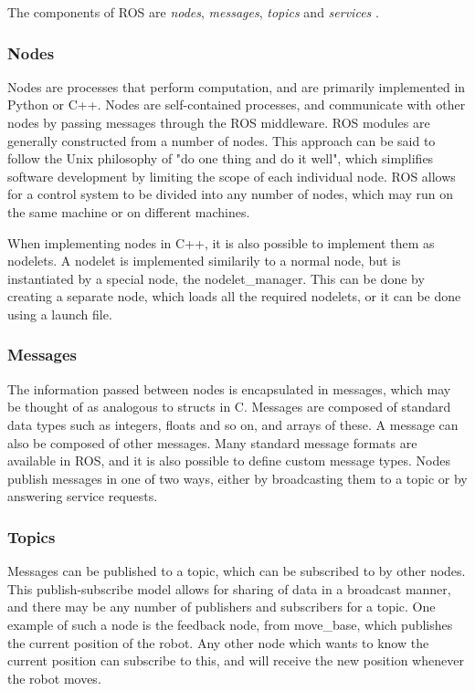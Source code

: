 \documentclass[\rootfolder/main.tex]{subfiles}
\begin{document}
The components of ROS are \emph{nodes}, \emph{messages}, \emph{topics} and \emph{services} \cite{Quigley2009}.

\subsubsection{Nodes}

Nodes are processes that perform computation, and are primarily implemented in Python or C++.
Nodes are self-contained processes, and communicate with other nodes by passing messages through the ROS middleware.
ROS modules are generally constructed from a number of nodes.
This approach can be said to follow the Unix philosophy of "do one thing and do it well", which simplifies software development by limiting the scope of each individual node.
ROS allows for a control system to be divided into any number of nodes, which may run on the same machine or on different machines.

When implementing nodes in C++, it is also possible to implement them as nodelets.
A nodelet is implemented similarily to a normal node, but is instantiated by a special node, the nodelet\_manager.
This can be done by creating a separate node, which loads all the required nodelets, or it can be done using a launch file.

\subsubsection{Messages}

The information passed between nodes is encapsulated in messages, which may be thought of as analogous to structs in C.
Messages are composed of standard data types such as integers, floats and so on, and arrays of these.
A message can also be composed of other messages.
Many standard message formats are available in ROS, and it is also possible to define custom message types.
Nodes publish messages in one of two ways, either by broadcasting them to a topic or by answering service requests.

\subsubsection{Topics}

Messages can be published to a topic, which can be subscribed to by other nodes.
This publish-subscribe model allows for sharing of data in a broadcast manner, and there may be any number of publishers and subscribers for a topic.
One example of such a node is the feedback node, from move\_base, which publishes the current position of the robot.
Any other node which wants to know the current position can subscribe to this, and will receive the new position whenever the robot moves.
\end{document}
